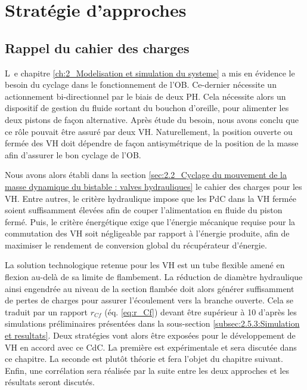 \section{Stratégie d'approches}
\label{sec:4.1 - Strategie d approches}
	\subsection{Rappel du cahier des charges}
	\label{subsec:4.1.1 - Rappel du cahier des charges}
\lettrine[lines=1]{L~}{}e chapitre \ref{ch:2_Modelisation et simulation du systeme} a mis en évidence le besoin du cyclage dans le fonctionnement de l'OB. Ce-dernier nécessite un actionnement bi-directionnel par le biais de deux PH. Cela nécessite alors un dispositif de gestion du fluide sortant du bouchon d'oreille, pour alimenter les deux pistons de façon alternative. Après étude du besoin, nous avons conclu que ce rôle pouvait être assuré par deux VH. Naturellement, la position ouverte ou fermée des VH doit dépendre de façon antisymétrique de la position de la masse afin d’assurer le bon cyclage de l'OB.

Nous avons alors établi dans la section \ref{sec:2.2_Cyclage du mouvement de la masse dynamique du bistable : valves hydrauliques} le cahier des charges pour les VH. Entre autres, le critère hydraulique impose que les PdC dans la VH fermée soient suffisamment élevées afin de couper l'alimentation en fluide du piston fermé. Puis, le critère énergétique exige que l'énergie mécanique requise pour la commutation des VH soit négligeable par rapport à l'énergie produite, afin de maximiser le rendement de conversion global du récupérateur d'énergie.

La solution technologique retenue pour les VH est un tube flexible amené en flexion au-delà de sa limite de flambement. La réduction de diamètre hydraulique ainsi engendrée au niveau de la section flambée doit alors générer suffisamment de pertes de charges pour assurer l'écoulement vers la branche ouverte. Cela se traduit par un rapport $r_{Cf}$ (éq. \ref{eq:r_Cf}) devant être supérieur à 10 d'après les simulations préliminaires présentées dans la sous-section \ref{subsec:2.5.3:Simulation et resultats}. Deux stratégies vont alors être exposées pour le développement de VH en accord avec ce CdC. La première est expérimentale et sera discutée dans ce chapitre. La seconde est plutôt théorie et fera l'objet du chapitre suivant. Enfin, une corrélation sera réalisée par la suite entre les deux approches et les résultats seront discutés.
